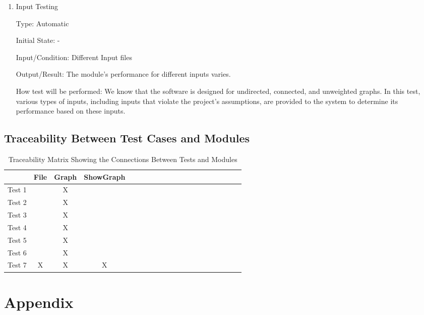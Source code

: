 \documentclass[12pt, titlepage]{article}
\begin{document}
\begin{enumerate}

\item{Input Testing\\}

Type: Automatic
					
Initial State: -
					
Input/Condition: Different Input files
					
Output/Result:  The module's performance for different inputs varies.
					
How test will be performed: We know that the software is designed for undirected, connected, and unweighted graphs. In this test, various types of inputs, including inputs that violate the project's assumptions, are provided to the system to determine its performance based on these inputs.
					


\end{enumerate}

\subsection{Traceability Between Test Cases and Modules}
\begin{table}[h!]
\centering
\begin{tabular}{|c|c|c|c|c|c|c|c|c|c|c|c|c|c|c|c|c|c|c|c|}
\hline
	&File &Graph &ShowGraph\\
\hline
Test 1     & & X&  \\ \hline
Test 2     & & X&  \\ \hline
Test 3    & & X&  \\ \hline
Test 4     & & X&  \\ \hline
Test 5     & & X&  \\ \hline
Test 6     & & X&  \\ \hline
Test 7     &X & X& X  \\ \hline

\end{tabular}
\caption{Traceability Matrix Showing the Connections Between Tests and Modules}
\label{Table:A_trace}
\end{table}

				


\newpage

\section{Appendix}
\end{document}
